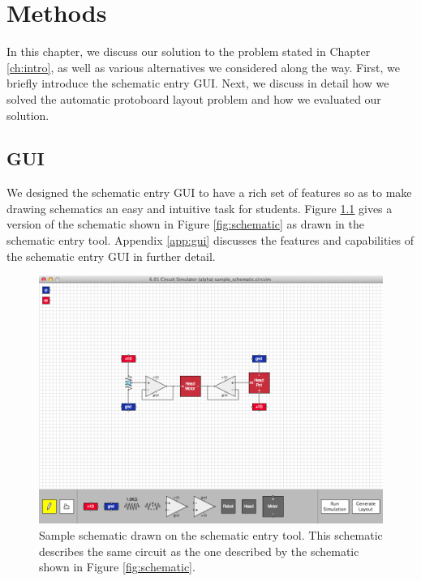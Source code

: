 
\chapter{Methods}
\label{ch:methods}

In this chapter, we discuss our solution to the problem stated in Chapter
\ref{ch:intro}, as well as various alternatives we considered along the way.
First, we briefly introduce the schematic entry GUI.
Next, we discuss in detail how we solved the automatic protoboard layout
problem and how we evaluated our solution.

\section{GUI}

We designed the schematic entry GUI to have a rich set of features so as to make
drawing schematics an easy and intuitive task for students.
Figure \ref{fig:gui_example} gives a version of the schematic shown in Figure
\ref{fig:schematic} as drawn in the schematic entry tool. Appendix \ref{app:gui}
discusses the features and capabilities of the schematic entry GUI in
further detail.

\begin{figure}
\begin{center}
\includegraphics[width=\textwidth]{Images/gui_example.png}
\caption[Schematic entry example]{Sample schematic drawn on the schematic entry
tool. This schematic describes the same circuit as the one described by the
schematic shown in Figure \ref{fig:schematic}.}
\label{fig:gui_example}
\end{center}
\end{figure}

